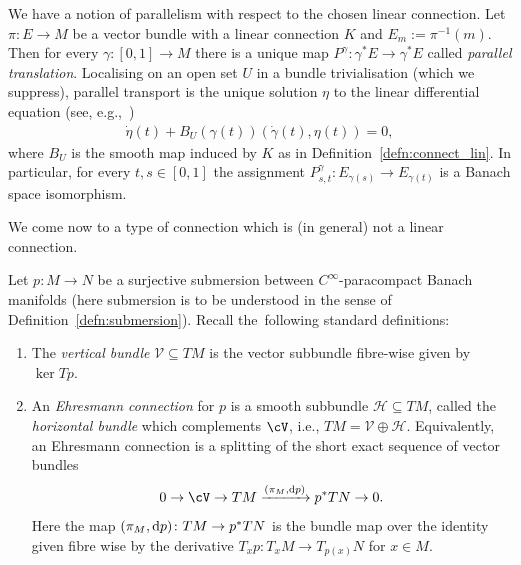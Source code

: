 We have a notion of parallelism with respect to the chosen linear connection.
\label{setup:parallel_tp}
Let $\pi \colon E \rightarrow M$ be a vector bundle with a linear connection $K$ and $E_m := \pi^{-1}(m)$.
Then for every $\gamma \colon [0,1] \rightarrow M$ there is a unique map $P^\gamma\colon \gamma^\ast E \rightarrow \gamma^\ast E$ called \emph{parallel translation}.
Localising on an open set $U$ in a bundle trivialisation (which we suppress), parallel transport is the unique solution $\eta$ to the linear differential equation (see, e.g.,~\mbox{\cite[Lemma~1.6.14]{Kli95}})
\begin{align}\label{eq:PT_diffeo}
\dot{\eta}(t) + B_U (\gamma(t)) (\dot{\gamma}(t),\eta(t))=0,
\end{align}
where $B_U$ is the smooth map induced by $K$ as in Definition~\ref{defn:connect_lin}.
In particular, for every $t,s \in [0,1]$ the assignment
$P_{s,t}^\gamma \colon E_{\gamma (s)} \rightarrow E_{\gamma (t)}$
is a Banach space isomorphism.

We come now to a type of connection which is (in general) not a linear connection.

\begin{Definition}
Let $p \colon M \rightarrow N$ be a surjective submersion between $C^\infty$-paracompact Banach manifolds (here submersion is to be understood in the sense of Definition~\ref{defn:submersion}). Recall the~following standard definitions:
\begin{enumerate}\itemsep=0pt
\item The \emph{vertical bundle} $\mathcal{V} \subseteq TM$ is the vector subbundle fibre-wise given by $\ker T p$.
\item An \emph{Ehresmann connection} for $p$ is a smooth subbundle $\mathcal{H} \subseteq TM$, called the \emph{horizontal bundle} which complements $\cV$, i.e., $TM=\mathcal{V} \oplus \mathcal{H}$.
Equivalently, an Ehresmann connection is a splitting of the short exact sequence of vector bundles
\begin{displaymath}0 \rightarrow \cV \rightarrow TM \xrightarrow{(\pi_M,{\rm d}p)} p^{\ast}TN \rightarrow 0.\end{displaymath}
Here the map $(\pi_M,{\rm d}p) \colon TM \rightarrow p^\ast TN$ is the bundle map over the identity given fibre wise by the derivative $T_xp \colon T_x M \rightarrow T_{p(x)}N$ for $x\in M$.
\end{enumerate}
\end{Definition}


